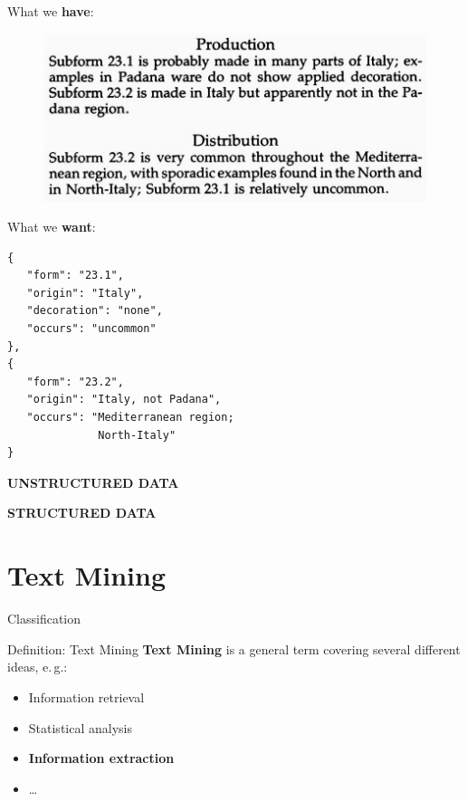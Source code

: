 \documentclass[xcolor=x11names, aspectratio=169,usenames,dvipsnames]{beamer}
\begin{document}
\begin{frame}[fragile]{}
\begin{minipage}[t]{0.45\textwidth}
What we \textbf{have}:\medskip

\begin{figure}
\includegraphics[width=1.0\textwidth]{img/consp_ex.jpg}
\end{figure}
\end{minipage}\hfill\pause
\begin{minipage}[t]{0.45\textwidth}
What we \textbf{want}:\medskip
{\scriptsize
\begin{verbatim}
{
   "form": "23.1",
   "origin": "Italy",
   "decoration": "none",
   "occurs": "uncommon"
},
{
   "form": "23.2",
   "origin": "Italy, not Padana",
   "occurs": "Mediterranean region;
              North-Italy"
}
\end{verbatim}
}
\end{minipage}\pause\medskip

\begin{minipage}[t]{0.45\textwidth}
\begin{center}
\alert{\textbf{UNSTRUCTURED DATA}}
\end{center}
\end{minipage}\hfill
\begin{minipage}[t]{0.45\textwidth}
\begin{center}
\alert{\textbf{STRUCTURED DATA}}
\end{center}
\end{minipage}
\end{frame}

\section{Text Mining}%

\begin{frame}{Classification}
\begin{block}{Definition: Text Mining}\vspace{.5em}
\textbf{Text Mining} is a \alert{general term} covering several different ideas\pause, e.\,g.:
\begin{itemize}[<+->]
\item Information retrieval
\item Statistical analysis
\item \textbf{Information extraction}
\item\dots
\end{itemize}
\end{block}
\end{frame}
\end{document}
